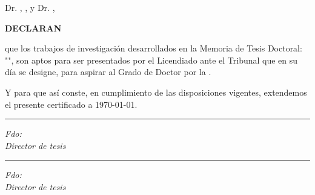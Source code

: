 \thispagestyle{empty}




\justifying
Dr. \textbf\thesisFirstSupervisor, \thesisFirstSupervisorPosition, y Dr. \textbf\thesisSecondSupervisor, \thesisSecondSupervisorPosition 

\vspace{8ex}
\raggedright
\textbf{DECLARAN}
\vspace{4ex}

\justifying
que los trabajos de investigación desarrollados en la Memoria de Tesis Doctoral: "\textit{\thesisTitle}", son aptos para ser presentados por el Licendiado \thesisName  ante el Tribunal que en su día se designe, para aspirar al Grado de Doctor por la \thesisUniversity. 


\vspace{2ex}
\justifying
Y para que así conste, en cumplimiento de las disposiciones vigentes, extendemos el presente certificado a \today.

\vspace{20ex}
\begin{minipage}[t]{.48\textwidth}
\centering
\rule{\textwidth}{.7pt}
\textit{Fdo:} \textbf{\thesisFirstSupervisor}\\
\textit{Director de tesis}
\end{minipage}
\begin{minipage}[t]{.48\textwidth}
\centering
\rule{\textwidth}{.7pt}
\textit{Fdo:} \textbf{\thesisSecondSupervisor}\\
\textit{Director de tesis}
\end{minipage}
